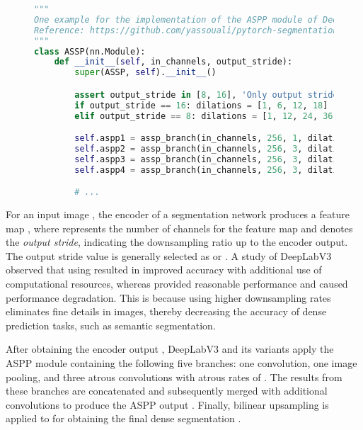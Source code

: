 \documentclass{article}
\begin{document}
\begin{figure}[t!]
	\begin{lstlisting}[language=Python, label=lst:aspp, caption=One example for the implementation of the ASPP module of DeepLabV3+ \citep{ssp} in PyTorch \citep{DBLP:conf/nips/PaszkeGMLBCKLGA19}.]
"""
One example for the implementation of the ASPP module of DeepLabV3+ in PyTorch.
Reference: https://github.com/yassouali/pytorch-segmentation/blob/master/models/deeplabv3_plus.py
"""
class ASSP(nn.Module):
    def __init__(self, in_channels, output_stride):
        super(ASSP, self).__init__()

        assert output_stride in [8, 16], 'Only output strides of 8 or 16 are suported'
        if output_stride == 16: dilations = [1, 6, 12, 18]
        elif output_stride == 8: dilations = [1, 12, 24, 36]

        self.aspp1 = assp_branch(in_channels, 256, 1, dilation=dilations[0])
        self.aspp2 = assp_branch(in_channels, 256, 3, dilation=dilations[1])
        self.aspp3 = assp_branch(in_channels, 256, 3, dilation=dilations[2])
        self.aspp4 = assp_branch(in_channels, 256, 3, dilation=dilations[3])

        # ...
\end{lstlisting}
\end{figure}

For an input image , the encoder of a segmentation network produces a feature map , where  represents the number of channels for the feature map and  denotes the \textit{output stride}, indicating the downsampling ratio up to the encoder output. The output stride value is generally selected as  or . A study of DeepLabV3 \citep{DBLP:journals/corr/ChenPSA17} observed that using  resulted in improved accuracy with additional use of computational resources, whereas  provided reasonable performance and  caused performance degradation. This is because using higher downsampling rates eliminates fine details in images, thereby decreasing the accuracy of dense prediction tasks, such as semantic segmentation.

After obtaining the encoder output , DeepLabV3 and its variants apply the ASPP module containing the following five branches: one  convolution, one image pooling, and three  atrous convolutions with atrous rates of . The results from these branches are concatenated and subsequently merged with additional convolutions to produce the ASPP output . Finally, bilinear upsampling is applied to  for obtaining the final dense segmentation .
\end{document}
